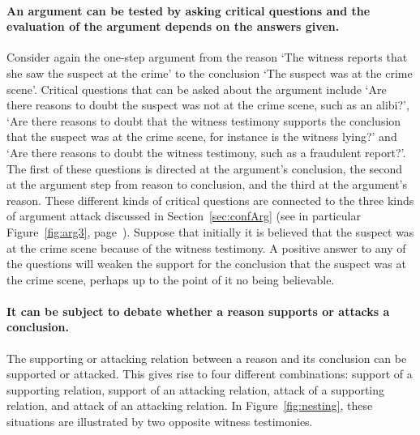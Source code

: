 \documentclass[10pt]{article}
\begin{document}


\paragraph{An argument can be tested by asking critical questions and the evaluation of the argument depends on the answers given.} 
Consider again the one-step argument from the reason `The witness reports that she saw the suspect at the crime' to the conclusion `The suspect was at the crime scene'. 
Critical questions that can be asked about the argument include `Are there reasons to doubt the suspect was not at the crime scene, such as an alibi?', `Are there reasons to doubt that the witness testimony supports the conclusion that the suspect was at the crime scene, for instance is the witness lying?' and `Are there reasons to doubt the witness testimony, such as a fraudulent report?'. The first of these questions is directed at the argument's conclusion, the second at the argument step from reason to conclusion, and the third at the argument's reason. These different kinds of critical questions are connected to the three kinds of argument attack discussed in Section~\ref{sec:confArg} (see in particular Figure~\ref{fig:arg3}, page~\pageref{fig:arg3}). 
Suppose that initially it is believed that the suspect was at the crime scene because of the witness testimony. A positive answer to any of the questions will weaken the support for the conclusion that the suspect was at the crime scene, perhaps up to the point of it no being believable.

\paragraph{It can be subject to debate whether a reason supports or attacks a conclusion.} The supporting or attacking relation between a reason and its conclusion can be supported or attacked. This gives rise to four different combinations: support of a supporting relation, support of an attacking relation, attack of a supporting relation, and attack of an attacking relation. In Figure~\ref{fig:nesting}, these situations are illustrated by two opposite witness testimonies. 
\end{document}
